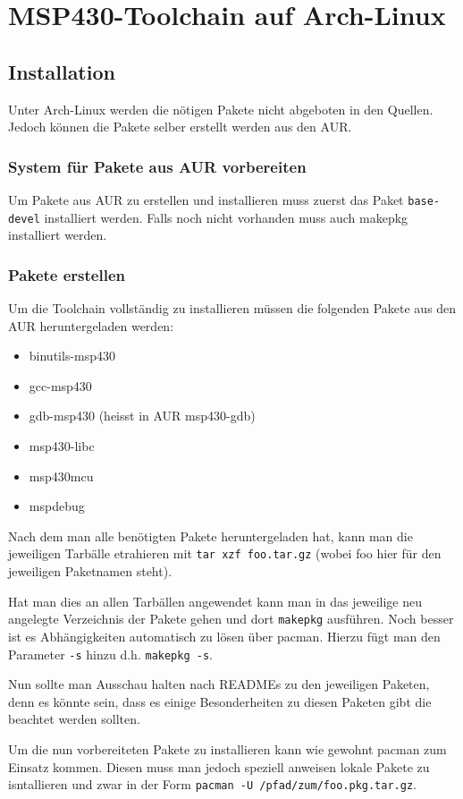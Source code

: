 \section{MSP430-Toolchain auf Arch-Linux}
\subsection{Installation}
Unter Arch-Linux werden die nötigen Pakete nicht abgeboten in den Quellen.
Jedoch können die Pakete selber erstellt werden aus den AUR.

\subsubsection{System für Pakete aus AUR vorbereiten}
Um Pakete aus AUR zu erstellen und installieren muss zuerst das Paket
\verb!base-devel! installiert werden. Falls noch nicht vorhanden muss auch
makepkg installiert werden.

\subsubsection{Pakete erstellen}
Um die Toolchain vollständig zu installieren müssen die folgenden Pakete aus
den AUR heruntergeladen werden:
\begin{itemize}
	\item binutils-msp430
	\item gcc-msp430
	\item gdb-msp430 (heisst in AUR msp430-gdb)
	\item msp430-libc
	\item msp430mcu
	\item mspdebug
\end{itemize}
Nach dem man alle benötigten Pakete heruntergeladen hat, kann man die 
jeweiligen Tarbälle etrahieren mit \verb!tar xzf foo.tar.gz! (wobei foo
hier für den jeweiligen Paketnamen steht).

Hat man dies an allen Tarbällen angewendet kann man in das jeweilige neu
angelegte Verzeichnis der Pakete gehen und dort \verb!makepkg! ausführen.
Noch besser ist es Abhängigkeiten automatisch zu lösen über pacman. Hierzu
fügt man den Parameter \verb!-s! hinzu d.h. \verb!makepkg -s!.

Nun sollte man Ausschau halten nach READMEs zu den jeweiligen Paketen, denn
es könnte sein, dass es einige Besonderheiten zu diesen Paketen gibt die
beachtet werden sollten. 

Um die nun vorbereiteten Pakete zu installieren kann wie gewohnt pacman zum
Einsatz kommen. Diesen muss man jedoch speziell anweisen lokale Pakete zu
isntallieren und zwar in der Form \verb!pacman -U /pfad/zum/foo.pkg.tar.gz!.

